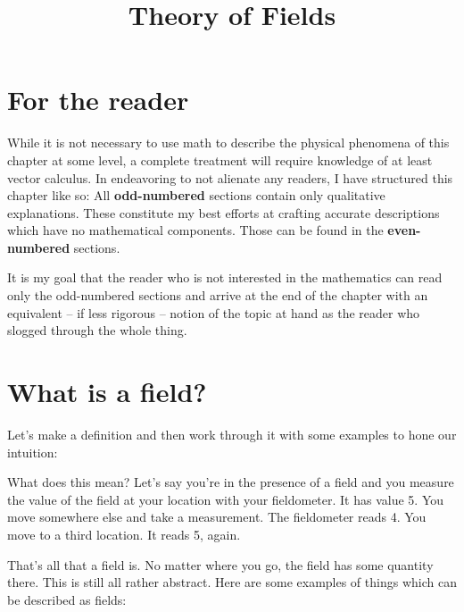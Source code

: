 \documentclass[11pt]{article}
\title{Theory of Fields}
\date{}                                           %
\begin{document}
\maketitle
\section*{For the reader}
While it is not necessary to use math to describe the physical phenomena of this chapter at some level, a complete treatment will require knowledge of at least vector calculus.  In endeavoring to not alienate any readers, I have structured this chapter like so:  All \textbf{odd-numbered} sections contain only qualitative explanations.  These constitute my best efforts at crafting accurate descriptions which have no mathematical components.  Those can be found in the \textbf{even-numbered} sections.

It is my goal that the reader who is not interested in the mathematics can read only the odd-numbered sections and arrive at the end of the chapter with an equivalent -- if less rigorous -- notion of the topic at hand as the reader who slogged through the whole thing.

\section{What is a field?}
Let's make a definition and then work through it with some examples to hone our intuition:
\begin{center}
\end{center}

What does this mean?  Let's say you're in the presence of a field and you measure the value of the field at your location with your fieldometer.  It has value 5.  You move somewhere else and take a measurement.  The fieldometer reads 4.  You move to a third location.  It reads 5, again.

That's all that a field is.  No matter where you go, the field has some quantity there.  This is still all rather abstract.  Here are some examples of things which can be described as fields:
\end{document}
